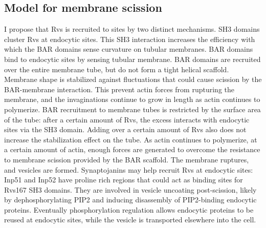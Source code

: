\documentclass[9pt,lineno]{elife}
\begin{document}
\subsection{Model for membrane scission}
I propose that Rvs is recruited to sites by two distinct mechanisms. SH3 domains cluster Rvs at endocytic sites. This SH3 interaction increases the efficiency with which the BAR domains sense curvature on tubular membranes. BAR domains bind to endocytic sites by sensing tubular membrane. BAR domains are recruited over the entire membrane tube, but do not form a tight helical scaffold. Membrane shape is stabilized against fluctuations that could cause scission by the BAR-membrane interaction. This prevent actin forces from rupturing the membrane, and the invaginations continue to grow in length as actin continues to polymerize. BAR recruitment to membrane tubes is restricted by the surface area of the tube: after a certain amount of Rvs, the excess interacts with endocytic sites via the SH3 domain. Adding over a certain amount of Rvs also does not increase the stabilization effect on the tube. As actin continues to polymerize, at a certain amount of actin, enough forces are generated to overcome the resistance to membrane scission provided by the BAR scaffold. The membrane ruptures, and vesicles are formed. Synaptojanins may help recruit Rvs at endocytic sites: Inp51 and Inp52 have proline rich regions that could act as binding sites for Rvs167 SH3 domains. They are involved in vesicle uncoating post-scission, likely by dephosphorylating PIP2 and inducing disassembly of PIP2-binding endocytic proteins. Eventually phosphorylation regulation allows endocytic proteins to be reused at endocytic sites, while the vesicle is transported elsewhere into the cell.


\end{document}
